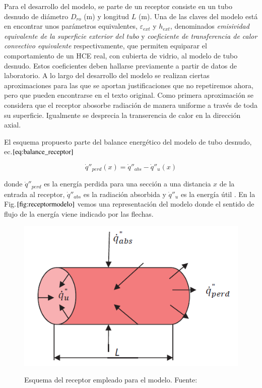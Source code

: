 Para el desarrollo del modelo, se parte de un receptor consiste en un tubo desnudo de diámetro \(D_{ro}\) (m) y longitud \(L\) (m). Una de las claves del modelo está en encontrar unos parámetros equivalentes, \(\varepsilon_{ext}\) y \(h_{ext}\),  denominados \textit{emisividad equivalente de la superficie exterior del tubo} y \textit{coeficiente de transferencia de calor convectivo equivalente} respectivamente, que permiten equiparar el comportamiento de un HCE real, con cubierta de vidrio, al modelo de tubo desnudo. Estos coeficientes deben hallarse previamente a partir de datos de laboratorio. A lo largo del desarrollo del modelo se realizan ciertas aproximaciones para las que se aportan justificaciones que no repetiremos ahora, pero que pueden encontrarse en el texto original. Como primera aproximación se considera que el receptor abosorbe radiación de manera uniforme a través de toda su superficie. Igualmente se desprecia la transerencia de calor en la dirección axial.

El esquema propuesto parte del balance energético del modelo de tubo desnudo, ec.\(\eqref{eq:balance_receptor}\)

\begin{equation}
    \dot q''_{perd}(x) = \dot q''_{abs}-\dot q''_{u}(x)  
    \label{eq:balance_receptor}
\end{equation}

donde \(\dot q''_{perd}\) es la energía perdida para una sección a una distancia \(x\) de la entrada al receptor, \(\dot q''_{abs}\) es la radiación absorbida y \(\dot q''_{u}\) es la energía útil . En la Fig.$\ref{fig:receptormodelo}$ vemos una representación del modelo donde el sentido de flujo de la energía viene indicado por las flechas.

\begin{figure}[H]
	\caption[Esquema del receptor empleado para el modelo]{Esquema del receptor empleado para el modelo. Fuente:\parencite{barberofresnoDesarrolloModeloTeorico2018}}
	\includegraphics[scale=0.8]{images/receptor_para_modelo.png}
	\label{fig:receptormodelo}
\end{figure}


